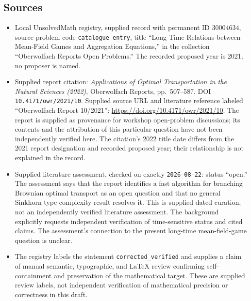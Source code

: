\documentclass[11pt]{article}
\begin{document}
\subsection{Sources}
\begin{itemize}
\item Local UnsolvedMath registry, supplied record with permanent ID \(30004634\), source problem code \texttt{catalogue entry}, title ``Long-Time Relations between Mean-Field Games and Aggregation Equations,'' in the collection ``Oberwolfach Reports Open Problems.'' The recorded proposed year is 2021; no proposer is named.
\item Supplied report citation: \emph{Applications of Optimal Transportation in the Natural Sciences (2022)}, Oberwolfach Reports, pp.\ 507--587, DOI \texttt{10.4171/owr/2021/10}. Supplied source URL and literature reference labeled ``Oberwolfach Report 10/2021'': \url{https://doi.org/10.4171/owr/2021/10}. The report is supplied as provenance for workshop open-problem discussions; its contents and the attribution of this particular question have not been independently verified here. The citation's 2022 title date differs from the 2021 report designation and recorded proposed year; their relationship is not explained in the record.
\item Supplied literature assessment, checked on exactly \texttt{2026-08-22}: status ``open.'' The assessment says that the report identifies a fast algorithm for branching Brownian optimal transport as an open question and that no general Sinkhorn-type complexity result resolves it. This is supplied dated curation, not an independently verified literature assessment. The background explicitly requests independent verification of time-sensitive status and cited claims. The assessment's connection to the present long-time mean-field-game question is unclear.
\item The registry labels the statement \texttt{corrected\_verified} and supplies a claim of manual semantic, typographic, and LaTeX review confirming self-containment and preservation of the mathematical target. These are supplied review labels, not independent verification of mathematical precision or correctness in this draft.
\end{itemize}
\end{document}
